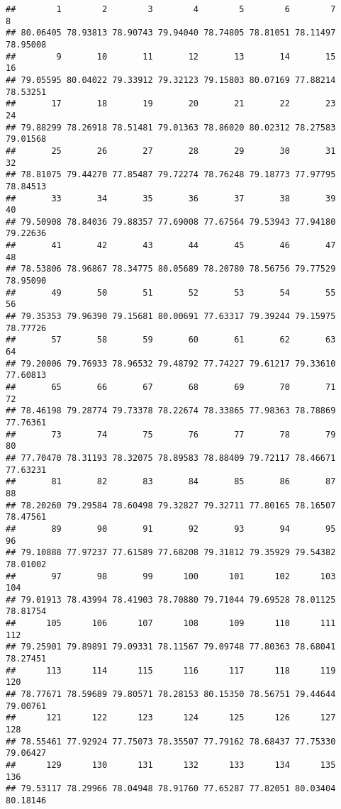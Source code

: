 \documentclass[
]{article}
\begin{document}
\begin{verbatim}
##        1        2        3        4        5        6        7        8 
## 80.06405 78.93813 78.90743 79.94040 78.74805 78.81051 78.11497 78.95008 
##        9       10       11       12       13       14       15       16 
## 79.05595 80.04022 79.33912 79.32123 79.15803 80.07169 77.88214 78.53251 
##       17       18       19       20       21       22       23       24 
## 79.88299 78.26918 78.51481 79.01363 78.86020 80.02312 78.27583 79.01568 
##       25       26       27       28       29       30       31       32 
## 78.81075 79.44270 77.85487 79.72274 78.76248 79.18773 77.97795 78.84513 
##       33       34       35       36       37       38       39       40 
## 79.50908 78.84036 79.88357 77.69008 77.67564 79.53943 77.94180 79.22636 
##       41       42       43       44       45       46       47       48 
## 78.53806 78.96867 78.34775 80.05689 78.20780 78.56756 79.77529 78.95090 
##       49       50       51       52       53       54       55       56 
## 79.35353 79.96390 79.15681 80.00691 77.63317 79.39244 79.15975 78.77726 
##       57       58       59       60       61       62       63       64 
## 79.20006 79.76933 78.96532 79.48792 77.74227 79.61217 79.33610 77.60813 
##       65       66       67       68       69       70       71       72 
## 78.46198 79.28774 79.73378 78.22674 78.33865 77.98363 78.78869 77.76361 
##       73       74       75       76       77       78       79       80 
## 77.70470 78.31193 78.32075 78.89583 78.88409 79.72117 78.46671 77.63231 
##       81       82       83       84       85       86       87       88 
## 78.20260 79.29584 78.60498 79.32827 79.32711 77.80165 78.16507 78.47561 
##       89       90       91       92       93       94       95       96 
## 79.10888 77.97237 77.61589 77.68208 79.31812 79.35929 79.54382 78.01002 
##       97       98       99      100      101      102      103      104 
## 79.01913 78.43994 78.41903 78.70880 79.71044 79.69528 78.01125 78.81754 
##      105      106      107      108      109      110      111      112 
## 79.25901 79.89891 79.09331 78.11567 79.09748 77.80363 78.68041 78.27451 
##      113      114      115      116      117      118      119      120 
## 78.77671 78.59689 79.80571 78.28153 80.15350 78.56751 79.44644 79.00761 
##      121      122      123      124      125      126      127      128 
## 78.55461 77.92924 77.75073 78.35507 77.79162 78.68437 77.75330 79.06427 
##      129      130      131      132      133      134      135      136 
## 79.53117 78.29966 78.04948 78.91760 77.65287 77.82051 80.03404 80.18146 

\end{verbatim}
\end{document}
